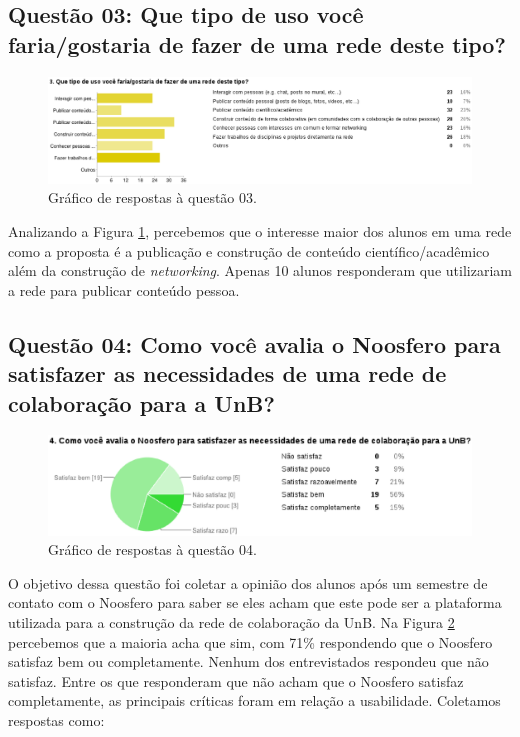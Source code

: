 \subsection*{Questão 03: Que tipo de uso você faria/gostaria de fazer de uma
rede deste tipo?}

\begin{figure}[h!]
    \centering
    \includegraphics[keepaspectratio=true,scale=0.5]
      {figuras/p3.eps}
    \caption{Gráfico de respostas à questão 03.}
    \label{response:3}
\end{figure}

Analizando a Figura \ref{response:3}, percebemos que o interesse maior dos
alunos em uma rede como a proposta é a publicação e construção de conteúdo
científico/acadêmico além da construção de \textit{networking}. Apenas 10
alunos responderam que utilizariam a rede para publicar conteúdo pessoa.

\subsection*{Questão 04: Como você avalia o Noosfero para satisfazer as
necessidades de uma rede de colaboração para a UnB?}

\begin{figure}[h!]
    \centering
    \includegraphics[keepaspectratio=true,scale=0.55]
      {figuras/p4.eps}
    \caption{Gráfico de respostas à questão 04.}
    \label{response:4}
\end{figure}

O objetivo dessa questão foi coletar a opinião dos alunos após um semestre de
contato com o Noosfero para saber se eles acham que este pode ser a plataforma
utilizada para a construção da rede de colaboração da UnB. Na Figura
\ref{response:4} percebemos que a maioria acha que sim, com 71\% respondendo
que o Noosfero satisfaz bem ou completamente. Nenhum dos entrevistados
respondeu que não satisfaz.
%
Entre os que responderam que não acham que o Noosfero satisfaz completamente,
as principais críticas foram em relação a usabilidade. Coletamos respostas
como:

